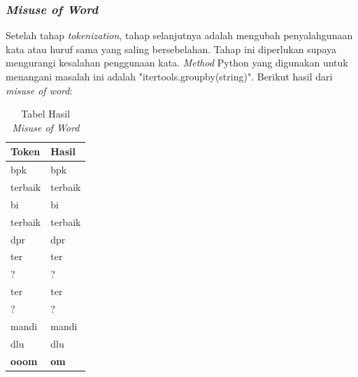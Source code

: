 \subsubsection{\textit{Misuse of Word}}
Setelah tahap \textit{tokenization}, tahap selanjutnya adalah mengubah penyalahgunaan kata atau huruf sama yang saling bersebelahan. Tahap ini diperlukan supaya mengurangi kesalahan penggunaan kata. \textit{Method} Python yang digunakan untuk menangani masalah ini adalah "itertools.groupby(string)". Berikut hasil dari \textit{misuse of word}: 
\begin{small}
	\begin{longtable}{|p{2cm}|p{2cm}|}
		\caption{Tabel Hasil \textit{Misuse of Word}}\\
		\hline
		\textbf{Token} & \textbf{Hasil} \\
		\hline
		\endhead
		bpk & bpk \\
		\hline
		terbaik & terbaik \\
		\hline
		bi & bi \\
		\hline
		terbaik & terbaik \\
		\hline
		dpr & dpr \\
		\hline
		ter & ter \\
		\hline
		? & ? \\
		\hline		
		ter & ter \\
		\hline
		? & ? \\
		\hline
		mandi & mandi \\
		\hline
		dlu & dlu \\
		\hline
		\textbf{ooom} & \textbf{om} \\
		\hline		
	\end{longtable}
\end{small}
